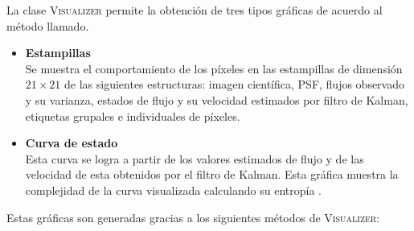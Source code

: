  
La clase \textsc{Visualizer} permite la obtenci\'on de tres tipos gr\'aficas de acuerdo al m\'etodo llamado.
 
\begin{itemize}
  
\item \textbf{Estampillas}\\ 
Se muestra el comportamiento de los p\'ixeles en las estampillas de dimensi\'on $21 \times 21$ de las siguientes estructuras: imagen cient\'ifica, PSF, flujos observado y su varianza, estados de flujo y su velocidad estimados por filtro de Kalman, etiquetas grupales e individuales de p\'ixeles.
\item \textbf{Curva de estado}\\
 Esta curva se logra a partir de los valores estimados de flujo y de las velocidad de esta obtenidos por el filtro de Kalman. Esta gr\'afica muestra la complejidad de la curva visualizada calculando su entrop\'ia \cite{balestrino}.
\end{itemize}

Estas gr\'aficas son generadas gracias a los siguientes m\'etodos de \textsc{Visualizer}:

